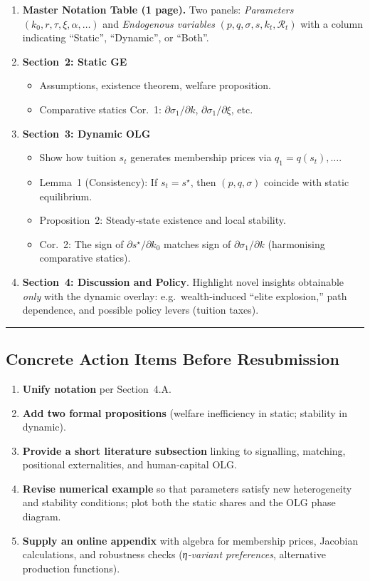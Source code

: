 \documentclass[12pt,letterpaper]{article}
\begin{document}
\begin{enumerate}%
	\item \textbf{Master Notation Table (1 page).}  
	Two panels: \emph{Parameters} $(k_0,r,\tau,\xi,\alpha,\dots)$ and \emph{Endogenous variables} $(p,q,\sigma,s,k_t,\mathcal R_t)$ with a column indicating “Static”, “Dynamic”, or “Both”.
	
	\item \textbf{Section~2: Static GE}  
	\begin{itemize}
		\item Assumptions, existence theorem, welfare proposition.
		\item Comparative statics Cor.\ 1: $\partial\sigma_1/\partial k$, $\partial\sigma_1/\partial\xi$, etc.
	\end{itemize}
	
	\item \textbf{Section~3: Dynamic OLG}  
	\begin{itemize}
		\item Show how tuition $s_t$ generates membership prices via $q_1=q(s_t),\dots$.
		\item Lemma~1 (Consistency): If $s_t=s^\star$, then $(p,q,\sigma)$ coincide with static equilibrium.
		\item Proposition~2: Steady‐state existence and local stability.
		\item Cor.\ 2: The sign of $\partial s^\star/\partial k_0$ matches sign of $\partial\sigma_1/\partial k$ (harmonising comparative statics).
	\end{itemize}
	
	\item \textbf{Section~4: Discussion and Policy}.  
	Highlight novel insights obtainable \emph{only} with the dynamic overlay: e.g.\ wealth‐induced “elite explosion,” path dependence, and possible policy levers (tuition taxes).
\end{enumerate}

\bigskip
\hrule
\bigskip

\subsection{Concrete Action Items Before Resubmission}

\begin{enumerate}%
	\item \textbf{Unify notation} per Section~4.A.
	\item \textbf{Add two formal propositions} (welfare inefficiency in static; stability in dynamic).
	\item \textbf{Provide a short literature subsection} linking to signalling, matching, positional externalities, and human‐capital OLG.
	\item \textbf{Revise numerical example} so that parameters satisfy new heterogeneity and stability conditions; plot both the static shares and the OLG phase diagram.
	\item \textbf{Supply an online appendix} with algebra for membership prices, Jacobian calculations, and robustness checks (\emph{η‐variant preferences}, alternative production functions).
\end{enumerate}
\end{document}
